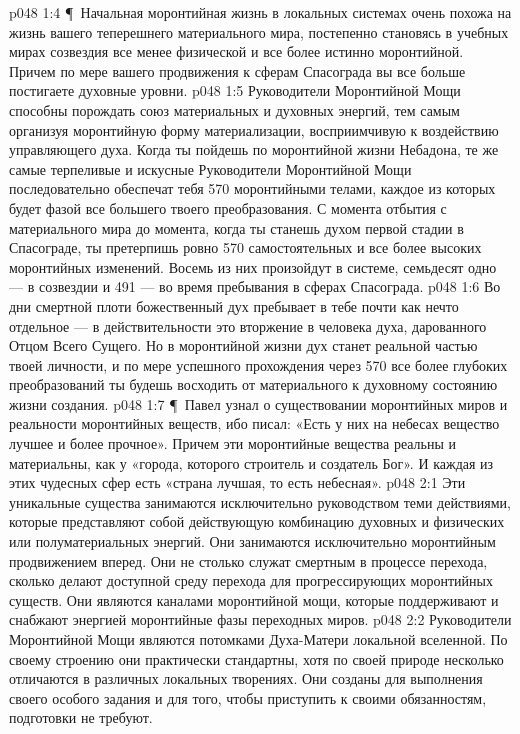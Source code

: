 \vs p048 1:4 \P\ Начальная моронтийная жизнь в локальных системах очень похожа на жизнь вашего теперешнего материального мира, постепенно становясь в учебных мирах созвездия все менее физической и все более истинно моронтийной. Причем по мере вашего продвижения к сферам Спасограда вы все больше постигаете духовные уровни.
\vs p048 1:5 Руководители Моронтийной Мощи способны порождать союз материальных и духовных энергий, тем самым организуя моронтийную форму материализации, восприимчивую к воздействию управляющего духа. Когда ты пойдешь по моронтийной жизни Небадона, те же самые терпеливые и искусные Руководители Моронтийной Мощи последовательно обеспечат тебя 570 моронтийными телами, каждое из которых будет фазой все большего твоего преобразования. С момента отбытия с материального мира до момента, когда ты станешь духом первой стадии в Спасограде, ты претерпишь ровно 570 самостоятельных и все более высоких моронтийных изменений. Восемь из них произойдут в системе, семьдесят одно --- в созвездии и 491 --- во время пребывания в сферах Спасограда.
\vs p048 1:6 Во дни смертной плоти божественный дух пребывает в тебе почти как нечто отдельное --- в действительности это вторжение в человека духа, дарованного Отцом Всего Сущего. Но в моронтийной жизни дух станет реальной частью твоей личности, и по мере успешного прохождения через 570 все более глубоких преобразований ты будешь восходить от материального к духовному состоянию жизни создания.
\vs p048 1:7 \P\ Павел узнал о существовании моронтийных миров и реальности моронтийных веществ, ибо писал: «Есть у них на небесах вещество лучшее и более прочное». Причем эти моронтийные вещества реальны и материальны, как у «города, которого строитель и создатель Бог». И каждая из этих чудесных сфер есть «страна лучшая, то есть небесная».
\vs p048 2:1 Эти уникальные существа занимаются исключительно руководством теми действиями, которые представляют собой действующую комбинацию духовных и физических или полуматериальных энергий. Они занимаются исключительно моронтийным продвижением вперед. Они не столько служат смертным в процессе перехода, сколько делают доступной среду перехода для прогрессирующих моронтийных существ. Они являются каналами моронтийной мощи, которые поддерживают и снабжают энергией моронтийные фазы переходных миров.
\vs p048 2:2 Руководители Моронтийной Мощи являются потомками Духа\hyp{}Матери локальной вселенной. По своему строению они практически стандартны, хотя по своей природе несколько отличаются в различных локальных творениях. Они созданы для выполнения своего особого задания и для того, чтобы приступить к своими обязанностям, подготовки не требуют.
